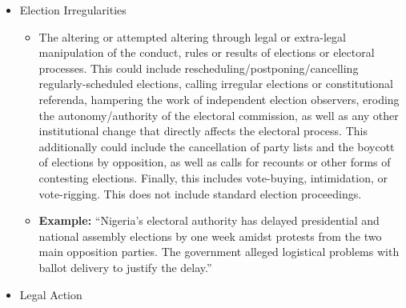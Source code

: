\documentclass[
  letterpaper,
  DIV=11,
  numbers=noendperiod]{scrartcl}
\providecommand{\tightlist}{%
  \setlength{\itemsep}{0pt}\setlength{\parskip}{0pt}}\usepackage{longtable,booktabs,array}
\begin{document}
\begin{itemize}
  \begin{itemize}
  \tightlist
  \item
    Reporting on regular electoral activities including the introduction
    of candidacies, the conduct of campaigns, the announcement of
    results, and the formal transfer of power for public office. This
    includes situations where the incumbent party/candidate retains
    power. Normal election results are an example of this event type.
    Specifically, this includes peaceful government transitions that are
    nonviolent transfers of power or legitimate continuity of government
    but does not include coups, which are accounted for separately.
  \item
    \textbf{Example:} ``The President of the Executive Board of the
    Serbian Progressive Party, Darko Glisic, said that the SNS won a
    convincing victory with 60.2 percent of the votes, based on the
    processed 221 out of 231 polling stations where the voting for the
    parliamentary elections in Serbia was repeated.''
  \end{itemize}
\item
  Election Irregularities

  \begin{itemize}
  \tightlist
  \item
    The altering or attempted altering through legal or extra-legal
    manipulation of the conduct, rules or results of elections or
    electoral processes. This could include
    rescheduling/postponing/cancelling regularly-scheduled elections,
    calling irregular elections or constitutional referenda, hampering
    the work of independent election observers, eroding the
    autonomy/authority of the electoral commission, as well as any other
    institutional change that directly affects the electoral process.
    This additionally could include the cancellation of party lists and
    the boycott of elections by opposition, as well as calls for
    recounts or other forms of contesting elections. Finally, this
    includes vote-buying, intimidation, or vote-rigging. This does not
    include standard election proceedings.
  \item
    \textbf{Example:} ``Nigeria's electoral authority has delayed
    presidential and national assembly elections by one week amidst
    protests from the two main opposition parties. The government
    alleged logistical problems with ballot delivery to justify the
    delay.''
  \end{itemize}
\item
  Legal Action


\end{itemize}
\end{document}
